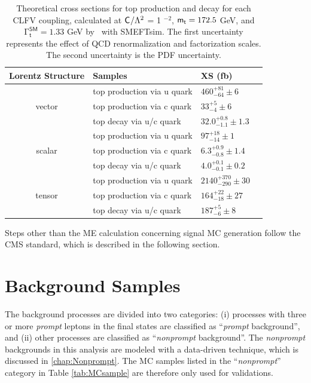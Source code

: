 \begin{table}[th]
\sffamily
\centering
\caption{Theoretical cross sections for top production and decay for each \ac{CLFV} coupling, calculated at $\textsf{C}^{}_{}/\mathrm{\Lambda}^2$ = 1 \TeV$^{-2}$, $\textsf{m}_{\textsf{t}} = 172.5$ GeV, and $\mathrm{\Gamma}_{\textsf{t}}^{\textsf{SM}} = 1.33$ GeV by \MG~with SMEFTsim. The first uncertainty represents the effect of \ac{QCD} renormalization and factorization scales. The second uncertainty is the \ac{PDF} uncertainty.}
\begin{tabular}{clll}
\toprule 
Lorentz Structure & Samples    & XS (fb) \\ \midrule
\multirow{3}{*}{vector} & top production via u quark & $460^{+81}_{-64}\pm6$ \\ 
  & top production via c quark & $33^{+5}_{-4}\pm6$ \\
  & top decay via u/c quark  & $32.0^{+0.8}_{-1.1}\pm1.3$ \\ \midrule
\multirow{3}{*}{scalar} &top production via u quark & $97^{+18}_{-14}\pm1$ \\ 
  & top production via c quark  & $6.3^{+0.9}_{-0.8}\pm1.4$ \\
  & top decay via u/c quark & $4.0^{+0.1}_{-0.1}\pm0.2$ \\ \midrule 
\multirow{3}{*}{tensor} & top production via u quark & $2140^{+370}_{-290}\pm30$ \\
  & top production via c quark & $164^{+22}_{-18}\pm27$ \\
  & top decay via u/c quark  & $187^{+5}_{-6}\pm8$ \\ \bottomrule
\end{tabular}
\vspace{-0.5em}
\label{tab:signal}
\end{table}

Steps other than the \ac{ME} calculation concerning signal \ac{MC} generation follow the \ac{CMS} standard, which is described in the following section.
\section{Background Samples}
\label{sec:Backgrounds}

The background processes are divided into two categories: (i) processes with three or more \emph{prompt} leptons in the final states are classified as ``\emph{prompt} background'', and (ii) other processes are classified as ``\emph{nonprompt} background''. The \emph{nonprompt} backgrounds in this analysis are modeled with a data-driven technique, which is discussed in \autoref{chap:Nonprompt}. The \ac{MC} samples listed in the ``\emph{nonprompt}'' category in Table \ref{tab:MCsample} are therefore only used for validations. 

